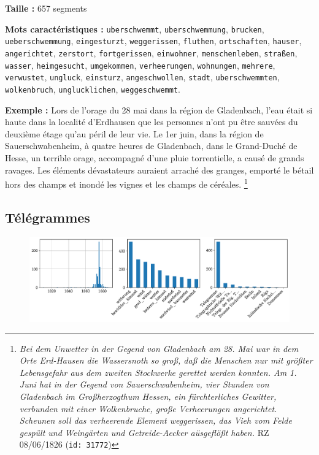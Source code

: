 \documentclass[a4paper,twoside,12pt]{article}
\begin{document}
\begin{flushleft}
\textbf{Taille :} 657 segments

\textbf{Mots caractéristiques :} \texttt{uberschwemmt}, \texttt{uberschwemmung}, \texttt{brucken}, \texttt{ueberschwemmung}, \texttt{eingesturzt}, \texttt{weggerissen}, \texttt{fluthen}, \texttt{ortschaften}, \texttt{hauser}, \texttt{angerichtet}, \texttt{zerstort}, \texttt{fortgerissen}, \texttt{einwohner}, \texttt{menschenleben}, \texttt{straßen}, \texttt{wasser}, \texttt{heimgesucht}, \texttt{umgekommen}, \texttt{verheerungen}, \texttt{wohnungen}, \texttt{mehrere}, \texttt{verwustet}, \texttt{ungluck}, \texttt{einsturz}, \texttt{angeschwollen}, \texttt{stadt}, \texttt{uberschwemmten}, \texttt{wolkenbruch}, \texttt{unglucklichen}, \texttt{weggeschwemmt}.
\end{flushleft}

\medskip

\noindent \textbf{Exemple :} \og Lors de l'orage du 28 mai dans la région de Gladenbach, l'eau était si haute dans la localité d'Erdhausen que les personnes n'ont pu être sauvées du deuxième étage qu'au péril de leur vie. Le 1er juin, dans la région de Sauerschwabenheim, à quatre heures de Gladenbach, dans le Grand-Duché de Hesse, un terrible orage, accompagné d'une pluie torrentielle, a causé de grands ravages. Les éléments dévastateurs auraient arraché des granges, emporté le bétail hors des champs et inondé les vignes et les champs de céréales.\fg{} \footnote{\textit{Bei dem Unwetter in der Gegend von Gladenbach am 28. Mai war in dem Orte Erd-Hausen die Wassersnoth so groß, daß die Menschen nur mit größter Lebensgefahr aus dem zweiten Stockwerke gerettet werden konnten. Am 1. Juni hat in der Gegend von Sauerschwabenheim, vier Stunden von Gladenbach im Großherzogthum Hessen, ein fürchterliches Gewitter, verbunden mit einer Wolkenbruche, große Verheerungen angerichtet. Scheunen soll das verheerende Element weggerissen, das Vieh vom Felde gespült und Weingärten und Getreide-Aecker aüsgeflößt haben.} RZ 08/06/1826 (\texttt{id: 31772})}

\clearpage



\subsection*{Télégrammes} \label{topic10_télégrammes}

\begin{figure}[H]
\centering
\includegraphics[width=\textwidth]{images/topic_charts_10.pdf}
\end{figure}
\end{document}
